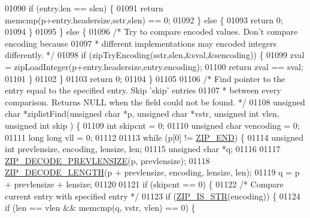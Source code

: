 \begin{DoxyCode}
{{01090         \textcolor{keywordflow}{if} (entry.len == slen) \{
01091             \textcolor{keywordflow}{return} memcmp(p+entry.headersize,sstr,slen) == 0;
01092         \} \textcolor{keywordflow}{else} \{
01093             \textcolor{keywordflow}{return} 0;
01094         \}
01095     \} \textcolor{keywordflow}{else} \{
01096         \textcolor{comment}{/* Try to compare encoded values. Don't compare encoding because}
01097 \textcolor{comment}{         * different implementations may encoded integers differently. */}
01098         \textcolor{keywordflow}{if} (zipTryEncoding(sstr,slen,&sval,&sencoding)) \{
01099           zval = zipLoadInteger(p+entry.headersize,entry.encoding);
01100           \textcolor{keywordflow}{return} zval == sval;
01101         \}
01102     \}
01103     \textcolor{keywordflow}{return} 0;
01104 \}
01105 
01106 \textcolor{comment}{/* Find pointer to the entry equal to the specified entry. Skip 'skip' entries}
01107 \textcolor{comment}{ * between every comparison. Returns NULL when the field could not be found. */}
01108 \textcolor{keywordtype}{unsigned} \textcolor{keywordtype}{char} *ziplistFind(\textcolor{keywordtype}{unsigned} \textcolor{keywordtype}{char} *p, \textcolor{keywordtype}{unsigned} \textcolor{keywordtype}{char} *vstr, \textcolor{keywordtype}{unsigned} \textcolor{keywordtype}{int} vlen, \textcolor{keywordtype}{unsigned} \textcolor{keywordtype}{int} skip
      ) \{
01109     \textcolor{keywordtype}{int} skipcnt = 0;
01110     \textcolor{keywordtype}{unsigned} \textcolor{keywordtype}{char} vencoding = 0;
01111     \textcolor{keywordtype}{long} \textcolor{keywordtype}{long} vll = 0;
01112 
01113     \textcolor{keywordflow}{while} (p[0] != \hyperlink{ziplist_8c_a31a8f9d5b5bad75318741cfca5de5ea8}{ZIP\_END}) \{
01114         \textcolor{keywordtype}{unsigned} \textcolor{keywordtype}{int} prevlensize, encoding, lensize, len;
01115         \textcolor{keywordtype}{unsigned} \textcolor{keywordtype}{char} *q;
01116 
01117         \hyperlink{ziplist_8c_a0bae94c4c67cbd6a27ea3e2f17fb0210}{ZIP\_DECODE\_PREVLENSIZE}(p, prevlensize);
01118         \hyperlink{ziplist_8c_acdddca374b430c930d4b2d08f5de7a62}{ZIP\_DECODE\_LENGTH}(p + prevlensize, encoding, lensize, len);
01119         q = p + prevlensize + lensize;
01120 
01121         \textcolor{keywordflow}{if} (skipcnt == 0) \{
01122             \textcolor{comment}{/* Compare current entry with specified entry */}
01123             \textcolor{keywordflow}{if} (\hyperlink{ziplist_8c_a2cb79e478d5bda74592c92230cfd6761}{ZIP\_IS\_STR}(encoding)) \{
01124                 \textcolor{keywordflow}{if} (len == vlen && memcmp(q, vstr, vlen) == 0) \{
}}
\end{DoxyCode}
